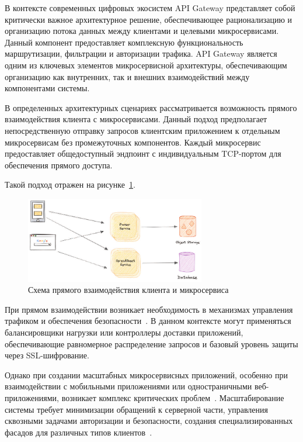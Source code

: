 В контексте современных цифровых экосистем API Gateway представляет собой критически важное архитектурное решение, обеспечивающее рационализацию и организацию потока данных между клиентами и целевыми микросервисами.
Данный компонент предоставляет комплексную функциональность маршрутизации, фильтрации и авторизации трафика. API Gateway является одним из ключевых элементов микросервисной архитектуры, обеспечивающим организацию как внутренних, так и внешних взаимодействий между компонентами системы.


В определенных архитектурных сценариях рассматривается возможность прямого взаимодействия клиента с микросервисами.
Данный подход предполагает непосредственную отправку запросов клиентским приложением к отдельным микросервисам без промежуточных компонентов.
Каждый микросервис предоставляет общедоступный эндпоинт с индивидуальным TCP-портом для обеспечения прямого доступа.

Такой подход отражен на рисунке~\ref{fig:direct_client_service}.
\begin{figure}[htbp]
    \centering
    \includegraphics[width=0.7\textwidth]{Dissertation/images/wo_gateway}
    \caption{Схема прямого взаимодействия клиента и микросервиса}
    \label{fig:direct_client_service}
\end{figure}

При прямом взаимодействии возникает необходимость в механизмах управления трафиком и обеспечения безопасности~\cite{trebichavsky2021}. В данном контексте могут применяться балансировщики нагрузки или контроллеры доставки приложений, обеспечивающие равномерное распределение запросов и базовый уровень защиты через SSL-шифрование.

Однако при создании масштабных микросервисных приложений, особенно при взаимодействии с мобильными приложениями или одностраничными веб-приложениями, возникает комплекс критических проблем~\cite{microsoft_api_gateway}. Масштабирование системы требует минимизации обращений к серверной части, управления сквозными задачами авторизации и безопасности, создания специализированных фасадов для различных типов клиентов~\cite{newman2015building}.

